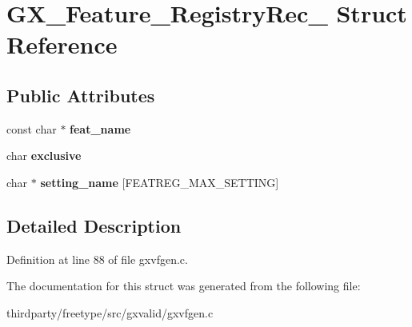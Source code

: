 \hypertarget{struct_g_x___feature___registry_rec__}{}\section{G\+X\+\_\+\+Feature\+\_\+\+Registry\+Rec\+\_\+ Struct Reference}
\label{struct_g_x___feature___registry_rec__}
\subsection*{Public Attributes}
\begin{DoxyCompactItemize}
\item 
\mbox{\label{struct_g_x___feature___registry_rec___a71b86a7c61d55416f5884b78d32d2929}} 
const char $\ast$ {\bfseries feat\+\_\+name}
\item 
\mbox{\label{struct_g_x___feature___registry_rec___ac03847857fa27d0e14d13a16e188c71a}} 
char {\bfseries exclusive}
\item 
\mbox{\label{struct_g_x___feature___registry_rec___ac880ad24c52c9a5e257bf750bc1fde2e}} 
char $\ast$ {\bfseries setting\+\_\+name} \mbox{[}F\+E\+A\+T\+R\+E\+G\+\_\+\+M\+A\+X\+\_\+\+S\+E\+T\+T\+I\+NG\mbox{]}
\end{DoxyCompactItemize}


\subsection{Detailed Description}


Definition at line 88 of file gxvfgen.\+c.



The documentation for this struct was generated from the following file\+:\begin{DoxyCompactItemize}
\item 
thirdparty/freetype/src/gxvalid/gxvfgen.\+c\end{DoxyCompactItemize}
